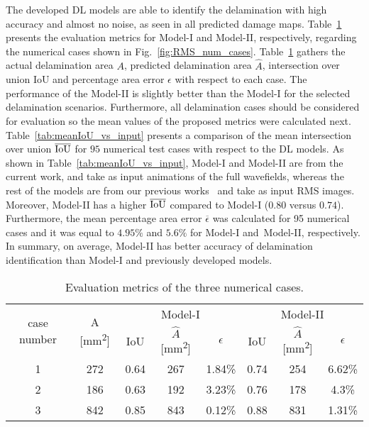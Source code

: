 \begin{sloppypar}
	The developed DL models are able to identify the delamination with high accuracy and almost no noise, as seen in all predicted damage maps.
	Table~\ref{tab:num_cases} presents the evaluation metrics for Model-I and Model-II, respectively, regarding the numerical cases shown in Fig.~\ref{fig:RMS_num_cases}.
	Table~\ref{tab:num_cases} gathers the actual delamination area \(A\), predicted delamination area \(\hat{A}\), intersection over union IoU and percentage area error \(\epsilon\) with respect to each case. 
	The performance of the Model-II is slightly better than the Model-I for the selected delamination scenarios.
	Furthermore, all delamination cases should be considered for evaluation so the mean values of the proposed metrics were calculated next.
	Table~\ref{tab:meanIoU_vs_input} presents a comparison of the mean intersection over union \(\overline{\textup{IoU}}\) for \(95\) numerical test cases with respect to the DL models.
	As shown in Table~\ref{tab:meanIoU_vs_input}, Model-I and Model-II are from the current work, and take as input animations of the full wavefields, whereas the rest of the models are from our previous works~\cite{Ijjeh2021, Ijjeh2022} and take as input RMS images.
	Moreover, Model-II has a higher \(\overline{\textup{IoU}}\) compared to Model-I (\(0.80\) versus \(0.74\)).
	Furthermore, the mean percentage area error \(\overline{\epsilon}\) was calculated for 95 numerical cases and it was equal to \(4.95 \%\) and \(5.6\%\) for Model-I and~Model-II, respectively.
	In summary, on average, Model-II has better accuracy of delamination identification than Model-I and previously developed models.
	\begin{table}[ht!]
		\caption{Evaluation metrics of the three numerical cases.}
		\begin{tabular}{cccccccc}
			\toprule
			\multirow{2}{*}{case number} & \multicolumn{1}{c}{\multirow{2}{*}{A [mm\textsuperscript{2}]}} & \multicolumn{3}{c}{Model-I} & \multicolumn{3}{c}{Model-II} \\ \cmidrule(lr){3-5} \cmidrule(lr){6-8} 
			& \multicolumn{1}{c}{}  & \multicolumn{1}{c}{IoU}  & \multicolumn{1}{c}{\(\hat{A}\) [mm\textsuperscript{2}]} & \(\epsilon\) & \multicolumn{1}{c}{IoU}  & \multicolumn{1}{c}{\(\hat{A}\) [mm\textsuperscript{2}]} & \(\epsilon\) \\ 
			\midrule
			1 & 272 & \multicolumn{1}{c}{0.64} & \multicolumn{1}{c}{267} & 1.84\% & \multicolumn{1}{c}{0.74} & \multicolumn{1}{c}{254} & 6.62\% \\ 
			2 &  186  & \multicolumn{1}{c}{0.63} & \multicolumn{1}{c}{192} & 3.23\% & \multicolumn{1}{c}{0.76} & \multicolumn{1}{c}{178} & 4.3\% \\ 
			3 & 842 & \multicolumn{1}{c}{0.85} &\multicolumn{1}{c}{843} & 0.12\%   & \multicolumn{1}{c}{0.88} & \multicolumn{1}{c}{831} & 1.31\% \\ 
			\bottomrule
		\end{tabular}	
		\label{tab:num_cases}
	\end{table}


\end{sloppypar}
